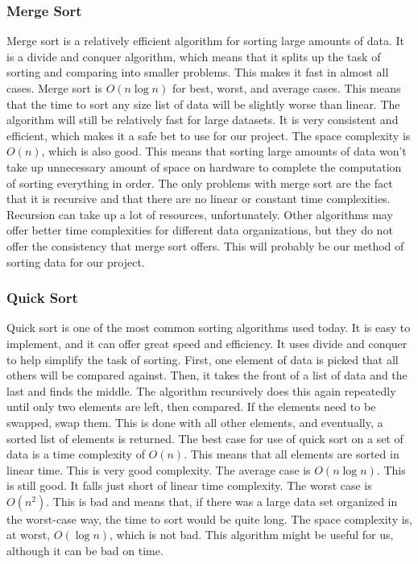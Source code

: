 \documentclass[onecolumn, draftclsnofoot,10pt, compsoc]{IEEEtran}
\begin{document}
\begin{singlespace}
\subsubsection{Merge Sort}
Merge sort is a relatively efficient algorithm for sorting large amounts of data. It is a
divide and conquer algorithm, which means that it splits up the task of sorting and
comparing into smaller problems. This makes it fast in almost all cases. Merge sort is
$O(n\log n)$ for best, worst, and average cases. This means that the time to sort any size
list of data will be slightly worse than linear. The algorithm will still be relatively fast
for large datasets. It is very consistent and efficient, which makes it a safe bet to use for
our project. The space complexity is $O(n)$, which is also good. This means that sorting
large amounts of data won’t take up unnecessary amount of space on hardware to
complete the computation of sorting everything in order. The only problems with merge
sort are the fact that it is recursive and that there are no linear or constant time
complexities. Recursion can take up a lot of resources, unfortunately. Other algorithms
may offer better time complexities for different data organizations, but they do not offer
the consistency that merge sort offers. This will probably be our method of sorting data
for our project.\cite{PairaSmita2016EMSA}
\subsubsection{Quick Sort}
Quick sort is one of the most common sorting algorithms used today. It is easy to
implement, and it can offer great speed and efficiency. It uses divide and conquer to
help simplify the task of sorting. First, one element of data is picked that all others will be 
compared against. Then, it takes the front of a list of data and the last and finds the
middle. The algorithm recursively does this again repeatedly until only two elements are
left, then compared. If the elements need to be swapped, swap them. This is done with
all other elements, and eventually, a sorted list of elements is returned. The best case for
use of quick sort on a set of data is a time complexity of $O(n)$. This means that all
elements are sorted in linear time. This is very good complexity. The average case is
$O(n\log n)$. This is still good. It falls just short of linear time complexity. The worst
case is $O(n^{2})$. This is bad and means that, if there was a large data set organized in the
worst-case way, the time to sort would be quite long. The space complexity is, at worst,
$O(\log n)$, which is not bad. This algorithm might be useful for us, although it can be bad
on time. \cite{SkienaStevenS2008TADM}

\end{singlespace}
\end{document}
